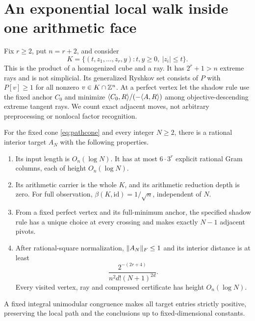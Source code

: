 \section{An exponential local walk inside one arithmetic face}\label{sec:paths}
Fix $r\ge2$, put $n=r+2$, and consider
\begin{equation}\label{eq:pathcone}
 K=\{(t,z_1,\ldots,z_r,y):t,y\ge0,\ |z_i|\le t\}.
\end{equation}
This is the product of a homogenized cube and a ray. It has $2^r+1>n$ extreme rays and is not simplicial. Its generalized Ryshkov set consists of $P$ with $P[v]\ge1$ for all nonzero $v\in K\cap\mathbb Z^n$. At a perfect vertex let the shadow rule use the fixed anchor $C_0$ and minimize $\langle C_0,R\rangle/(-\langle A,R\rangle)$ among objective-descending extreme tangent rays. We count exact adjacent moves, not arbitrary preprocessing or nonlocal factor recognition.

\begin{theorem}\label{thm:path}
For the fixed cone \eqref{eq:pathcone} and every integer $N\ge2$, there is a rational interior target $A_N$ with the following properties.
\begin{enumerate}[label=(\roman*)]
\item Its input length is $O_n(\log N)$. It has at most $6\cdot3^r$ explicit rational Gram columns, each of height $O_n(\log N)$.
\item Its arithmetic carrier is the whole $K$, and its arithmetic reduction depth is zero. For full observation, $\beta(K,\mathrm{id})=1/\sqrt n$, independent of $N$.
\item From a fixed perfect vertex and its full-minimum anchor, the specified shadow rule has a unique choice at every crossing and makes exactly $N-1$ adjacent pivots.
\item After rational-square normalization, $\lVert A_N\rVert_F\le1$ and its interior distance is at least
\begin{equation}\label{eq:pathradius}
 \frac{2^{-(2r+4)}}{n^2d!(N+1)^{2d}}.
\end{equation}
Every visited vertex, ray and compressed certificate has height $O_n(\log N)$.
\end{enumerate}
A fixed integral unimodular congruence makes all target entries strictly positive, preserving the local path and the conclusions up to fixed-dimensional constants.
\end{theorem}

